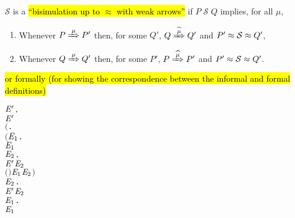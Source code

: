 \begin{definition}%
  \label{def:doubleweak}
$\mathcal{S}$ is a \hl{``bisimulation up to $\approx$ with weak arrows''} if $P \;
  \mathcal{S} \; Q$ implies, for all $\mu$,
\begin{enumerate}
\item Whenever $P \Arr{\mu} P'$ then, for some $Q'$, $Q \Arcap{\mu} Q'$ and $P' \approx {\cal S} \approx Q'$,
\item Whenever $Q \Arr{\mu} Q'$ then, for some $P'$, $P \Arcap{\mu} P'$ and $P' \approx {\cal S} \approx Q'$.
\end{enumerate}
\hl{or formally (for showing the correspondence between the informal and formal definitions)}
\begin{alltt}
      \HOLTokenDefEquality{}
      \HOLSymConst{\HOLTokenForall{}} \ensuremath{\HOLBoundVar{E}\sp{\prime}}.
            \ensuremath{\HOLBoundVar{E}\sp{\prime}} \HOLSymConst{\HOLTokenImp{}}
          \ensuremath{(}\HOLSymConst{\HOLTokenForall{}}.
               \ensuremath{(}\HOLSymConst{\HOLTokenForall{}}\ensuremath{\HOLBoundVar{E}\sb{\mathrm{1}}}.
                     \HOLTokenWeakTransBegin{} \HOLTokenWeakTransEnd \ensuremath{\HOLBoundVar{E}\sb{\mathrm{1}}} \HOLSymConst{\HOLTokenImp{}}
                    \HOLSymConst{\HOLTokenExists{}}\ensuremath{\HOLBoundVar{E}\sb{\mathrm{2}}}.
                        \ensuremath{\HOLBoundVar{E}\sp{\prime}} \HOLTokenWeakTransBegin{} \HOLTokenWeakTransEnd \ensuremath{\HOLBoundVar{E}\sb{\mathrm{2}}} \HOLSymConst{\HOLTokenConj{}}
                        \ensuremath{(} \HOLSymConst{\HOLTokenRCompose{}}  \HOLSymConst{\HOLTokenRCompose{}} \ensuremath{)} \ensuremath{\HOLBoundVar{E}\sb{\mathrm{1}}} \ensuremath{\HOLBoundVar{E}\sb{\mathrm{2}}}\ensuremath{)} \HOLSymConst{\HOLTokenConj{}}
               \HOLSymConst{\HOLTokenForall{}}\ensuremath{\HOLBoundVar{E}\sb{\mathrm{2}}}.
                   \ensuremath{\HOLBoundVar{E}\sp{\prime}} \HOLTokenWeakTransBegin{} \HOLTokenWeakTransEnd \ensuremath{\HOLBoundVar{E}\sb{\mathrm{2}}} \HOLSymConst{\HOLTokenImp{}}
                   \HOLSymConst{\HOLTokenExists{}}\ensuremath{\HOLBoundVar{E}\sb{\mathrm{1}}}.
                        \HOLTokenWeakTransBegin{} \HOLTokenWeakTransEnd \ensuremath{\HOLBoundVar{E}\sb{\mathrm{1}}} \HOLSymConst{\HOLTokenConj{}}

\end{alltt}
\end{definition}
